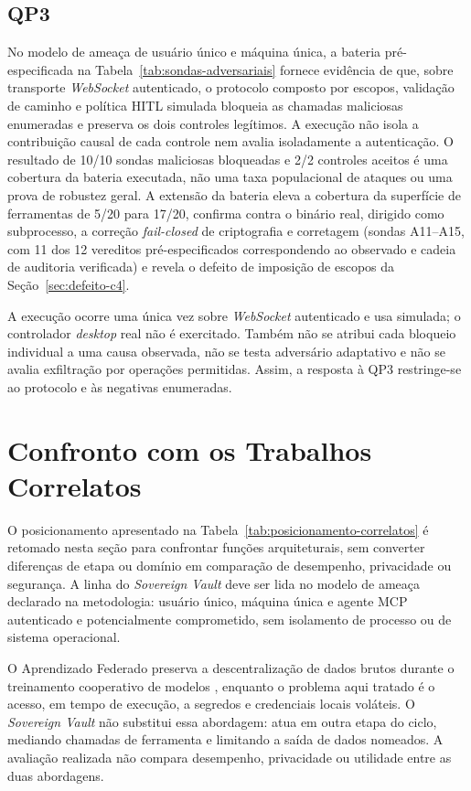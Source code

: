 \documentclass[12pt,openright,twoside,a4paper,english,brazil]{abntex2}
\begin{document}
\subsection{QP3}
No modelo de ameaça de usuário único e máquina única, a bateria pré-especificada na Tabela~\ref{tab:sondas-adversariais} fornece evidência de que, sobre transporte \textit{WebSocket} autenticado, o protocolo composto por escopos, validação de caminho e política HITL simulada bloqueia as chamadas maliciosas enumeradas e preserva os dois controles legítimos. A execução não isola a contribuição causal de cada controle nem avalia isoladamente a autenticação. O resultado de 10/10 sondas maliciosas bloqueadas e 2/2 controles aceitos é uma cobertura da bateria executada, não uma taxa populacional de ataques ou uma prova de robustez geral. A extensão da bateria eleva a cobertura da superfície de ferramentas de 5/20 para 17/20, confirma contra o binário real, dirigido como subprocesso, a correção \textit{fail-closed} de criptografia e corretagem (sondas A11--A15, com 11 dos 12 vereditos pré-especificados correspondendo ao observado e cadeia de auditoria verificada) e revela o defeito de imposição de escopos da Seção~\ref{sec:defeito-c4}.

A execução ocorre uma única vez sobre \textit{WebSocket} autenticado e usa  simulada; o controlador \textit{desktop} real  não é exercitado. Também não se atribui cada bloqueio individual a uma causa observada, não se testa adversário adaptativo e não se avalia exfiltração por operações permitidas. Assim, a resposta à QP3 restringe-se ao protocolo e às negativas enumeradas.

\section{Confronto com os Trabalhos Correlatos}
O posicionamento apresentado na Tabela~\ref{tab:posicionamento-correlatos} é retomado nesta seção para confrontar funções arquiteturais, sem converter diferenças de etapa ou domínio em comparação de desempenho, privacidade ou segurança. A linha do \textit{Sovereign Vault} deve ser lida no modelo de ameaça declarado na metodologia: usuário único, máquina única e agente MCP autenticado e potencialmente comprometido, sem isolamento de processo ou de sistema operacional.

O Aprendizado Federado preserva a descentralização de dados brutos durante o treinamento cooperativo de modelos \cite{mcmahan2017,mammen2021}, enquanto o problema aqui tratado é o acesso, em tempo de execução, a segredos e credenciais locais voláteis. O \textit{Sovereign Vault} não substitui essa abordagem: atua em outra etapa do ciclo, mediando chamadas de ferramenta e limitando a saída de dados nomeados. A avaliação realizada não compara desempenho, privacidade ou utilidade entre as duas abordagens.
\end{document}
